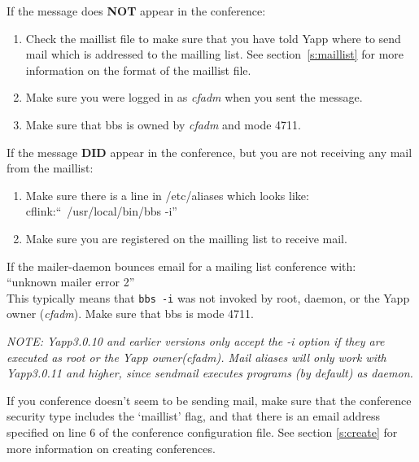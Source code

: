 \documentclass[twoside]{report}
\begin{document}
      If the message does {\bf NOT} appear in the conference:
      \begin{enumerate}
         \item Check the maillist file to make sure that you have told Yapp 
            where to send mail which is addressed  to the mailling list.  
            See section~\ref{s:maillist} for more information on the format 
            of the maillist file.

         \item Make sure you were logged in as {\em cfadm} when you sent the 
            message.
	
         \item Make sure that bbs is owned by {\em cfadm} and mode 4711.
      \end{enumerate}

      If the message {\bf DID} appear in the conference, but you are not 
      receiving any mail from the maillist:
      \begin{enumerate}
         \item Make sure there is a line in /etc/aliases which looks 
               like:\\
            cflink:``\vline \ /usr/local/bin/bbs -i'' \\
	
         \item Make sure you are registered on the mailling list to receive 
            mail.
      \end{enumerate}

      If the mailer-daemon bounces email for a mailing list conference with:\\
      ``unknown mailer error 2''\\
      This typically means that {\tt bbs -i} was not invoked by root, daemon,
      or the Yapp owner ({\em cfadm}).  Make sure that bbs is mode 4711.  

      {\em NOTE: Yapp3.0.10 and earlier versions only accept the 
      -i option if they are executed as root or the Yapp owner({\em cfadm}). 
      Mail aliases will only work with Yapp3.0.11 and higher, since 
      sendmail executes programs (by default) as daemon.}

      If you conference doesn't seem to be sending mail, make sure that the
      conference security type includes the `maillist' flag, and that there 
      is an email address specified on line 6 of the conference configuration
      file. See section \ref{s:create} for more information on creating 
      conferences.
\end{document}
